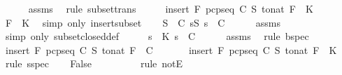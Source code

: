 \begin{isabellebody}
\ \ \ \ \isamarkupfalse%
\ assms{\isacharparenleft}{}{\isacharparenright}\ \isamarkupfalse%
\ {\isacharparenleft}rule\ subset{\isacharunderscore}trans{\isacharparenright}\isanewline
\ \ \isamarkupfalse%
\ \isamarkupfalse%
\ {\isachardoublequoteopen}insert\ F\ {\isacharparenleft}pcp{\isacharunderscore}seq\ C\ S\ {\isacharparenleft}to{\isacharunderscore}nat\ F{\isacharparenright}{\isacharparenright}\ {\isasymsubseteq}\ K{\isachardoublequoteclose}\ \isanewline
\ \ \ \ \isamarkupfalse%
\ {\isacartoucheopen}F\ {\isasymin}\ K{\isacartoucheclose}\ \isamarkupfalse%
\ {\isacharparenleft}simp\ only{\isacharcolon}\ insert{\isacharunderscore}subset{\isacharparenright}\isanewline
\ \ \isamarkupfalse%
\ {\isachardoublequoteopen}{\isasymforall}S\ {\isasymin}\ C{\isachardot}\ {\isasymforall}s{\isasymsubseteq}S{\isachardot}\ s\ {\isasymin}\ C{\isachardoublequoteclose}\isanewline
\ \ \ \ \isamarkupfalse%
\ assms{\isacharparenleft}{}{\isacharparenright}\ \isamarkupfalse%
\ {\isacharparenleft}simp\ only{\isacharcolon}\ subset{\isacharunderscore}closed{\isacharunderscore}def{\isacharparenright}\isanewline
\ \ \isamarkupfalse%
\ \isamarkupfalse%
\ {\isachardoublequoteopen}{\isasymforall}s\ {\isasymsubseteq}\ K{\isachardot}\ s\ {\isasymin}\ C{\isachardoublequoteclose}\isanewline
\ \ \ \ \isamarkupfalse%
\ assms{\isacharparenleft}{}{\isacharparenright}\ \isamarkupfalse%
\ {\isacharparenleft}rule\ bspec{\isacharparenright}\isanewline
\ \ \isamarkupfalse%
\ \isamarkupfalse%
\ {}{\isacharcolon}{\isachardoublequoteopen}insert\ F\ {\isacharparenleft}pcp{\isacharunderscore}seq\ C\ S\ {\isacharparenleft}to{\isacharunderscore}nat\ F{\isacharparenright}{\isacharparenright}\ {\isasymin}\ C{\isachardoublequoteclose}\ \isanewline
\ \ \ \ \isamarkupfalse%
\ {\isacartoucheopen}insert\ F\ {\isacharparenleft}pcp{\isacharunderscore}seq\ C\ S\ {\isacharparenleft}to{\isacharunderscore}nat\ F{\isacharparenright}{\isacharparenright}\ {\isasymsubseteq}\ K{\isacartoucheclose}\ \isamarkupfalse%
\ {\isacharparenleft}rule\ sspec{\isacharparenright}\isanewline
\ \ \isamarkupfalse%
\ {\isachardoublequoteopen}False{\isachardoublequoteclose}\isanewline
\ \ \ \ \isamarkupfalse%
\ {}\ {}\ \isamarkupfalse%
\ {\isacharparenleft}rule\ notE{\isacharparenright}\isanewline

\end{isabellebody}
